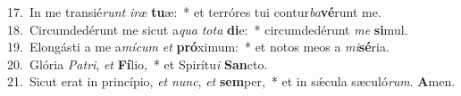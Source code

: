 {17.~}In me transié\textit{runt} \textit{i}\textit{ræ} \textbf{tu}æ:~* et terróres tui contur\textit{ba}\textbf{vé}runt me.\\
{18.~}Circumdedérunt me sicut a\textit{qua} \textit{to}\textit{ta} \textbf{di}e:~* circumdedérunt \textit{me} \textbf{si}mul.\\
{19.~}Elongásti a me a\textit{mí}\textit{cum} \textit{et} \textbf{pró}ximum:~* et notos meos a \textit{mi}\textbf{sé}ria.\\
{20.~}Glória \textit{Pa}\textit{tri}, \textit{et} \textbf{Fí}lio,~* et Spirítu\textit{i} \textbf{San}cto.\\
{21.~}Sicut erat in princípio, \textit{et} \textit{nunc}, \textit{et} \textbf{sem}per,~* et in sǽcula sæculó\textit{rum}. \textbf{A}men.\\
